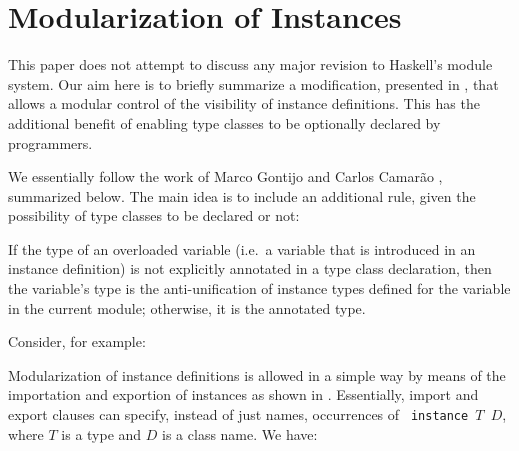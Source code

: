 \section{Modularization of Instances}
\label{sec:modular-instances}

This paper does not attempt to discuss any major revision to Haskell's
module system. Our aim here is to briefly summarize a modification,
presented in \cite{...}, that allows a modular control of the
visibility of instance definitions. This has the additional benefit of
enabling type classes to be optionally declared by programmers.

We essentially follow the work of Marco Gontijo and Carlos Camarão
\cite{Controlling-scope-instances}, summarized below. The main idea is
to include an additional rule, given the possibility of type classes
to be declared or not:

\begin{definition}

If the type of an overloaded variable (i.e.~a variable that is
introduced in an instance definition) is not explicitly annotated in a
type class declaration, then the variable's type is the
anti-unification of instance types defined for the variable in the
current module; otherwise, it is the annotated type.

\label{overloaded-variable-type}
\end{definition}

Consider, for example:



            
Modularization of instance definitions is allowed in a simple way by
means of the importation and exportion of instances as shown in
\cite{Controlling-scope-instances}. Essentially, import and export
clauses can specify, instead of just names, occurrences of {\tt
  instance $T$ $D$}, where $T$ is a type and $D$ is a class name.
We have: 

